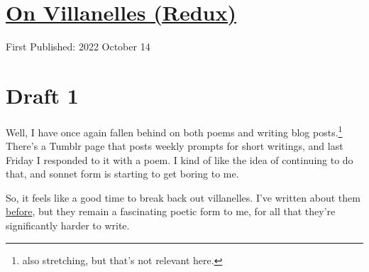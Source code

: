 \documentclass[12pt]{article}[titlepage]
\newcommand{\1}{\={a}}
\newcommand{\2}{\={e}}
\newcommand{\3}{\={\i}}
\newcommand{\4}{\=o}
\newcommand{\5}{\=u}
\newcommand{\6}{\={A}}
\renewcommand{\,}{\textsuperscript{,}}
\begin{document}
\doublespacing
\section{\href{villanelles-2.tex}{On Villanelles (Redux)}}
First Published: 2022 October 14

\section{Draft 1}
Well, I have once again fallen behind on both poems and writing blog posts.\footnote{also stretching, but that's not relevant here.}
There's a Tumblr page that posts weekly prompts for short writings, and last Friday I responded to it with a poem.
I kind of like the idea of continuing to do that, and sonnet form is starting to get boring to me.

So, it feels like a good time to break back out villanelles.
I've written about them \href{on-villanelles.html}{before}, but they remain a fascinating poetic form to me, for all that they're significantly harder to write.
\end{document}
